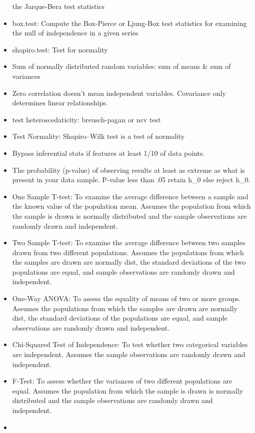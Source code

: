 \documentclass[]{book}
\theoremstyle{definition}
\theoremstyle{definition}
\theoremstyle{definition}
\theoremstyle{remark}
\begin{document}
\begin{itemize}
  the Jarque-Bera test statistics
\item
  box.test: Compute the Box-Pierce or Ljung-Box test statistics for
  examining the null of independence in a given series
\item
  shapiro.test: Test for normality
\item
  Sum of normally distributed random variables: sum of means \& sum of
  variances
\item
  Zero correlation doesn't mean independent variables. Covariance only
  determines linear relationships.
\item
  test heteroscedaticity: breusch-pagan or ncv test
\item
  Test Normality: Shapiro--Wilk test is a test of normality
\item
  Bypass inferential stats if features at least 1/10 of data points.
\item
  The probability (p-value) of observing results at least as extreme as
  what is present in your data sample. P-value less than .05 retain h\_0
  else reject h\_0.
\item
  One Sample T-test: To examine the average difference between a sample
  and the known value of the population mean. Assumes the population
  from which the sample is drawn is normally distributed and the sample
  observations are randomly drawn and independent.
\item
  Two Sample T-test: To examine the average difference between two
  samples drawn from two different populations. Assumes the populations
  from which the samples are drawn are normally dist, the standard
  deviations of the two populations are equal, and sample observations
  are randomly drawn and independent.
\item
  One-Way ANOVA: To assess the equality of means of two or more groups.
  Assumes the populations from which the samples are drawn are normally
  dist, the standard deviations of the populations are equal, and sample
  observations are randomly drawn and independent.
\item
  Chi-Squared Test of Independence: To test whether two categorical
  variables are independent. Assumes the sample observations are
  randomly drawn and independent.
\item
  F-Test: To assess whether the variances of two different populations
  are equal. Assumes the population from which the sample is drawn is
  normally distributed and the sample observations are randomly drawn
  and independent.
\item

\end{itemize}
\end{document}
